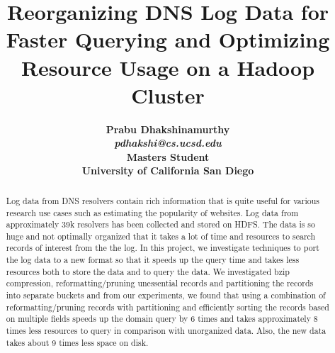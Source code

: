 \documentclass[11pt,a4paper]{article}
\begin{document}
\title{\bf Reorganizing DNS Log Data for Faster Querying and Optimizing Resource Usage on a Hadoop Cluster}
\author{
	\bf Prabu Dhakshinamurthy\\
	\textit{pdhakshi@cs.ucsd.edu}\\
	Masters Student\\
	University of California San Diego
}
\date {}
\maketitle

\begin{abstract} 
\noindent
Log data from DNS resolvers contain rich information that is quite useful for various research use cases such as estimating the popularity of websites. Log data from approximately 39k resolvers has been collected and stored on HDFS. The data is so huge and not optimally organized that it takes a lot of time and resources to search records of interest from the the log. In this project, we investigate techniques to port the log data to a new format so that it speeds up the query time and takes less resources both to store the data and to query the data. We investigated bzip compression, reformatting/pruning unessential records and partitioning the records into separate buckets and from our experiments, we found that using a combination of reformatting/pruning records with partitioning and efficiently sorting the records based on multiple fields speeds up the domain query by 6 times and takes approximately 8 times less resources to query in comparison with unorganized data. Also, the new data takes about 9 times less space on disk.
\end{abstract} 
\end{document}
